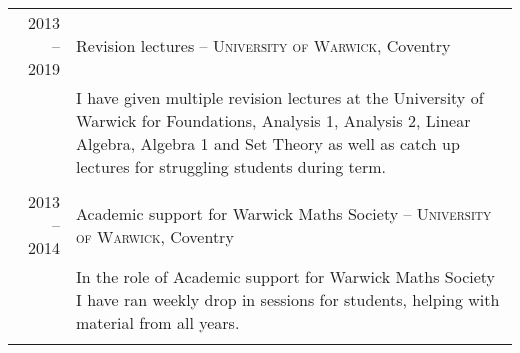 \documentclass[a4paper,10pt]{article}
\begin{document}
\begin{tabular}{r|p{15cm}}
\textsc{2013 -- 2019}& Revision lectures -- \textsc{University of Warwick}, Coventry\\&\footnotesize{I have given multiple revision lectures at the University of Warwick for Foundations, Analysis 1, Analysis 2, Linear Algebra, Algebra 1 and Set Theory as well as catch up lectures for struggling students during term.}\\\multicolumn{2}{c}{} \\
\textsc{2013 -- 2014} & Academic support for Warwick Maths Society -- \textsc{University of Warwick}, Coventry\\&\footnotesize{In the role of Academic support for Warwick Maths Society I have ran weekly drop in sessions for students, helping with material from all years.}\\\multicolumn{2}{c}{} \\
\end{tabular}
\end{document}
